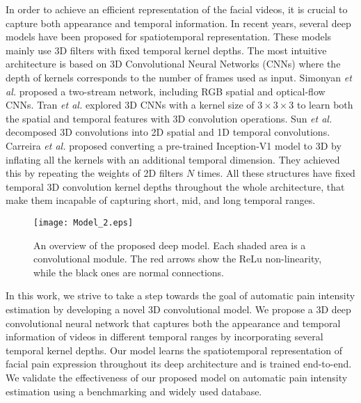\documentclass[a4paper,conference]{IEEEtran}
\begin{document}
In order to achieve an efficient representation of the facial videos, it is crucial to capture both appearance and temporal information. In recent years, several deep models have been proposed for spatiotemporal representation. These models mainly use 3D filters with fixed temporal kernel depths. The most intuitive architecture is based on 3D Convolutional Neural Networks (CNNs) \cite{c13} where the depth of kernels corresponds to the number of frames used as input. Simonyan \emph{et al.} \cite{c14} proposed a two-stream network, including RGB spatial and optical-flow CNNs. Tran \emph{et al.} \cite{c15} explored 3D CNNs with a kernel size of $3\times 3\times 3$ to learn both the spatial and temporal features with 3D convolution operations. Sun \emph{et al.} \cite{c16} decomposed 3D convolutions into 2D spatial and 1D temporal convolutions. Carreira \emph{et al.} \cite{c17} proposed converting a pre-trained Inception-V1 \cite{c18} model to 3D by inflating all the kernels with an additional temporal dimension. They achieved this by repeating the weights of 2D filters $N$ times. All these structures have fixed temporal 3D convolution kernel depths throughout the whole architecture, that make them incapable of capturing short, mid, and long temporal ranges. 
\begin{figure*}[t]
\begin{center}
	\texttt{[image: Model\_2.eps]}
\end{center}
	\caption{An overview of the proposed deep model. Each shaded area is a convolutional module. The red arrows show the ReLu non-linearity, while the black ones are normal connections.}
    \label{Fig1}
\end{figure*}

In this work, we strive to take a step towards the goal of automatic pain intensity estimation by developing a novel 3D convolutional model. We propose a 3D deep convolutional neural network that captures both the appearance and temporal information of videos in different temporal ranges by incorporating several temporal kernel depths. Our model learns the spatiotemporal representation of facial pain expression throughout its deep architecture and is trained end-to-end. We validate the effectiveness of our proposed model on automatic pain intensity estimation using a benchmarking and widely used database. %

\end{document}
